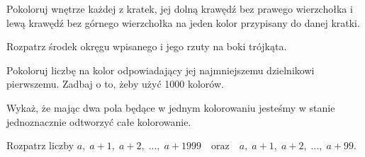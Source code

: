 
\begin{hints_list}
	\item *
	\item Pokoloruj wnętrze każdej z kratek, jej dolną krawędź bez prawego wierzchołka i lewą krawędź bez górnego wierzchołka na jeden kolor przypisany do danej kratki.
	\item Rozpatrz środek okręgu wpisanego i jego rzuty na boki trójkąta.
	\item Pokoloruj liczbę na kolor odpowiadający jej najmniejszemu dzielnikowi pierwszemu. Zadbaj o to, żeby użyć 1000 kolorów.
	\item Wykaż, że mając dwa pola będące w jednym kolorowaniu jesteśmy w stanie jednoznacznie odtworzyć całe kolorowanie.
	\item Rozpatrz liczby $a,\; a + 1,\; a + 2,\; ...,\; a + 1999 \quad \text{oraz} \quad
	a,\; a + 1,\; a + 2,\; ..., \; a + 99.$
\end{hints_list}